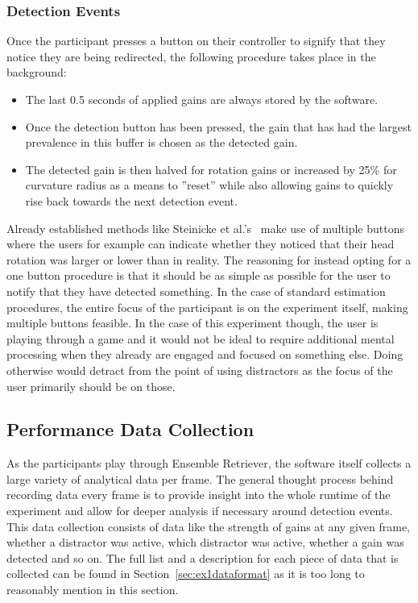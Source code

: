 \subsubsection{Detection Events}
Once the participant presses a button on their controller to signify that they notice they are being redirected, the following procedure takes place in the background:

\begin{itemize}
    \item The last 0.5 seconds of applied gains are always stored by the software.
    \item Once the detection button has been pressed, the gain that has had the largest prevalence in this buffer is chosen as the detected gain. 
    \item The detected gain is then halved for rotation gains or increased by 25\% for curvature radius as a means to ''reset'' while also allowing gains to quickly rise back towards the next detection event.
\end{itemize}

Already established methods like Steinicke et al.'s~\cite{5072212} make use of multiple buttons where the users for example can indicate whether they noticed that their head rotation was larger or lower than in reality. The reasoning for instead opting for a one button procedure is that it should be as simple as possible for the user to notify that they have detected something. In the case of standard estimation procedures, the entire focus of the participant is on the experiment itself, making multiple buttons feasible. In the case of this experiment though, the user is playing through a game and it would not be ideal to require additional mental processing when they already are engaged and focused on something else. Doing otherwise would detract from the point of using distractors as the focus of the user primarily should be on those. 

\subsection{Performance Data Collection}
As the participants play through Ensemble Retriever, the software itself collects a large variety of analytical data per frame. The general thought process behind recording data every frame is to provide insight into the whole runtime of the experiment and allow for deeper analysis if necessary around detection events. This data collection consists of data like the strength of gains at any given frame, whether a distractor was active, which distractor was active, whether a gain was detected and so on. The full list and a description for each piece of data that is collected can be found in Section~\ref{sec:ex1dataformat} as it is too long to reasonably mention in this section.

